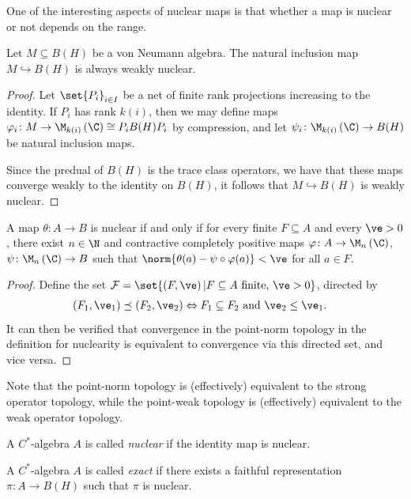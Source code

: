 \documentclass[10pt]{mypackage}
\begin{document}
One of the interesting aspects of nuclear maps is that whether a map is nuclear or not depends on the range.
\begin{proposition}
  Let $M\subseteq B(H)$ be a von Neumann algebra. The natural inclusion map $M\hookrightarrow B(H)$ is always weakly nuclear.
\end{proposition}
\begin{proof}
  Let $\set{P_i}_{i\in I}$ be a net of finite rank projections increasing to the identity. If $P_i$ has rank $k(i)$, then we may define maps $\varphi_i\colon M\rightarrow \M_{k(i)}\left( \C \right)\cong P_i B(H)P_i$ by compression, and let $\psi_i\colon \M_{k(i)}\left( \C \right) \rightarrow B(H)$ be natural inclusion maps.

  Since the predual of $B(H)$ is the trace class operators, we have that these maps converge weakly to the identity on $B(H)$, it follows that $M\hookrightarrow B(H)$ is weakly nuclear.
\end{proof}
\begin{proposition}
  A map $\theta\colon A\rightarrow B$ is nuclear if and only if for every finite $F\subseteq A$ and every $\ve > 0$, there exist $n\in \N$ and contractive completely positive maps $\varphi\colon A\rightarrow \M_n\left( \C \right)$, $\psi\colon \M_n\left( \C \right)\rightarrow B$ such that $\norm{\theta(a)-\psi\circ\varphi(a)} < \ve$ for all $a\in F$.
\end{proposition}
\begin{proof}
  Define the set $\mathcal{F} = \set{\left( F,\ve \right) | F\subseteq A\text{ finite, }\ve > 0}$, directed by
  \begin{align*}
    \left( F_1,\ve_1 \right)\preceq \left( F_2,\ve_2 \right) &\Leftrightarrow F_1\subseteq F_2\text{ and }\ve_2 \leq \ve_1.
  \end{align*}
  It can then be verified that convergence in the point-norm topology in the definition for nuclearity is equivalent to convergence via this directed set, and vice versa.
\end{proof}
Note that the point-norm topology is (effectively) equivalent to the strong operator topology, while the point-weak topology is (effectively) equivalent to the weak operator topology.
\begin{definition}
  A $C^{\ast}$-algebra $A$ is called \textit{nuclear} if the identity map is nuclear.
\end{definition}
\begin{definition}
  A $C^{\ast}$-algebra $A$ is called \textit{exact} if there exists a faithful representation $\pi\colon A\rightarrow B(H)$ such that $\pi$ is nuclear.
\end{definition}
\end{document}
